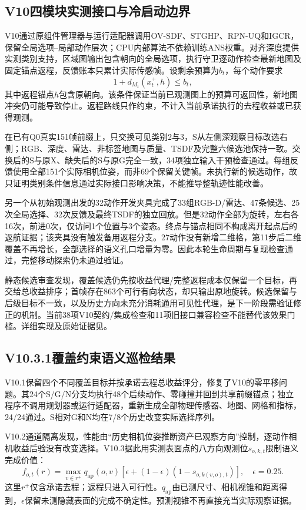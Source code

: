 \documentclass[11pt,a4paper]{article}
\begin{document}
\subsection{V10四模块实测接口与冷启动边界}
V10通过原组件管理器与运行适配器调用OV-SDF、STGHP、RPN-UQ和IGCR，保留全局选项--局部动作层次；CPU内部算法不依赖训练ANS权重。对齐深度提供实测类别支持，区域图输出包含朝向的全局选项，执行守卫逐动作检查最新地图及固定锚点返程，反馈账本只累计实际传感帧。设剩余预算为$b_t$，每个动作要求
\begin{equation}
1+d_{M_t}(x_t^+,h)\le b_t,
\end{equation}
其中返程锚点$h$包含原朝向。该条件保证当前已观测图上的预算可返回性，新地图冲突仍可能导致停止。返程路线只作约束，不计入当前承诺执行的去程收益或已获得观测。

在已有Q0真实151帧前缀上，只交换可见类别2与3，S从左侧深观察目标改选右侧；RGB、深度、雷达、非标签地图与质量、TSDF及完整六候选池保持一致。交换后的S与原X、缺失后的S与原G完全一致，34项独立输入干预检查通过。每组反馈使用全部151个实际相机位姿，而非69个保留关键帧。未执行新的候选动作，故只证明类别条件信息通过实际接口影响决策，不能推导整轨迹性能改善。

另一个从初始观测出发的32动作开发夹具完成了33组RGB-D/雷达、47条候选、25次全局选择、32次反馈及最终TSDF的独立回放。但是32动作全部为旋转，左右各16次，前进0次，仅访问1个位置与3个姿态。终点与锚点相同不构成离开起点后的返航证据；该夹具没有触发备用返程分支。27动作没有新增二维格，第11步后二维覆盖不再增长，全部选择的语义孔口增量为零。因此本轮生命周期与复现检查通过，完整移动探索仍未通过验证。

静态候选审查发现，覆盖候选仍先按收益代理/完整返程成本仅保留一个目标，再交给总收益排序；首帧存在863个可行有向状态，却只输出原地旋转。候选保留与后级目标不一致，以及历史方向未充分消耗通用可见性代理，是下一阶段需验证修正的机制。当前38项V10契约/集成检查和11项旧接口兼容检查不能替代该效果门槛。详细实现及原始证据见。

\subsection{V10.3.1覆盖约束语义巡检结果}

V10.1保留四个不同覆盖目标并按承诺去程总收益评分，修复了V10的零平移问题。其24个S/G/N分支均执行48个后续动作、零碰撞并回到共享前缀锚点；独立程序不调用规划器或运行适配器，重新生成全部物理传感器、地图、网格和指标，24/24通过。S相对G和N均在7/8个历史改变实际选择序列。

V10.2通道隔离发现，性能由“历史相机位姿推断资产已观察方向”控制，逐动作相机收益后验没有改变选择。V10.3据此用实测表面点的八方向观测位$s_{o,k,t}$限制语义完成价值：
\begin{equation}
 f_{o,t}(r)=\max_{v\in r^+}q_{\mathrm{ap}}(o,v)
 \left[\epsilon+(1-\epsilon)(1-s_{o,k(v,o),t})\right],\quad\epsilon=0.25.
\end{equation}
这里$r^+$仅含承诺去程；返程只进入可行性。$q_{\mathrm{ap}}$由已测尺寸、相机视锥和距离得到，$\epsilon$保留未测隐藏表面的完成不确定性。预测视锥不再直接充当实际观察证据。
\end{document}
